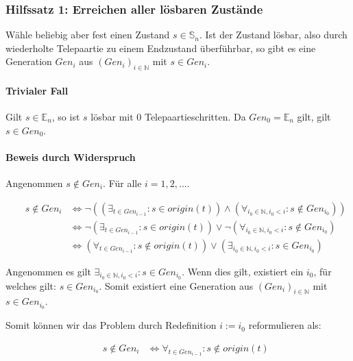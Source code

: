 \documentclass[a4paper,10pt,ngerman]{scrartcl}
\begin{document}
\subsubsection{Hilfssatz 1: Erreichen aller lösbaren Zustände} \label{proof:completeness}

Wähle beliebig aber fest einen Zustand \(s\in\mathbb{S}_n\).
Ist der Zustand lösbar, also durch wiederholte Telepaartie zu einem Endzustand überführbar, so gibt es eine Generation \(Gen_i\) aus \((Gen_i)_{i\in\mathbb{N}}\) mit \(s\in Gen_i\).

\paragraph{Trivialer Fall}
Gilt \(s\in\mathbb{E}_n\), so ist \(s\) lösbar mit 0 Telepaartieschritten. Da \(Gen_0 = \mathbb{E}_n\) gilt, gilt \(s \in Gen_0\).

\paragraph{Beweis durch Widerspruch}

Angenommen \(s \notin Gen_{i}\). Für alle \(i=1,2,...\).

\begin{align*}
    &&s \notin Gen_{i} &\iff \lnot\left(\left(\exists_{t \in Gen_{i-1}} : s \in origin(t)\right) \land \left(\forall_{i_0\in\mathbb{N}, i_0 < i}: s \notin Gen_{i_0}\right)\right) \\
    && &\iff \lnot\left(\exists_{t \in Gen_{i-1}} : s \in origin(t)\right) \lor \lnot\left(\forall_{i_0\in\mathbb{N}, i_0 < i}: s \notin Gen_{i_0}\right) \\
    && &\iff \left(\forall_{t \in Gen_{i-1}} : s \notin origin(t)\right) \lor \left(\exists_{i_0\in\mathbb{N}, i_0 < i}: s \in Gen_{i_0}\right)
\end{align*}

Angenommen es gilt \(\exists_{i_0\in\mathbb{N}, i_0 < i}: s \in Gen_{i_0}\). Wenn dies gilt, existiert ein \(i_0\), für welches gilt: \(s \in Gen_{i_0}\). Somit existiert eine Generation aus \((Gen_i)_{i\in\mathbb{N}}\) mit \(s \in Gen_{i_0}\).

Somit können wir das Problem durch Redefinition \(i := i_0\) reformulieren als:

\begin{align*}
    &&s \notin Gen_{i} 
    &\iff \forall_{t \in Gen_{i-1}} : s \notin origin(t)
\end{align*}
\end{document}
